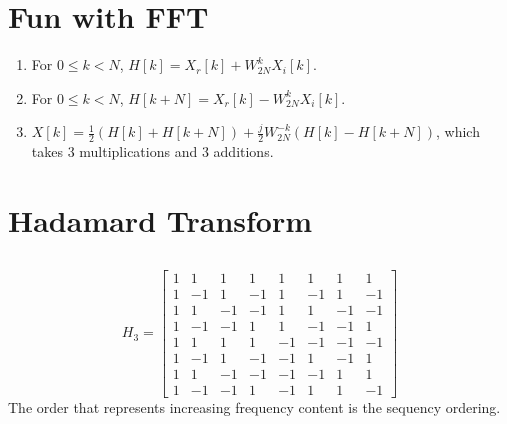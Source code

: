 \documentclass{article}
\begin{document}
\newpage
\section{Fun with FFT}

\begin{enumerate}
    \item For \(0 \leqslant k < N\), \(H[k] = X_r[k] + W_{2N}^k X_i[k]\).
    \item For \(0 \leqslant k < N\), \(H[k + N] = X_r[k] - W_{2N}^k X_i[k]\).
    \item \(X[k] = \frac{1}{2} (H[k] + H[k + N]) + \frac{j}{2} W_{2N}^{-k} (H[k] - H[k + N])\), which takes 3 multiplications and 3 additions.
\end{enumerate}

\newpage
\section{Hadamard Transform}

\subsection{}

\begin{equation}
    H_3 =
    \begin{bmatrix}
        1 & 1 & 1 & 1 & 1 & 1 & 1 & 1 \\
        1 & -1 & 1 & -1 & 1 & -1 & 1 & -1 \\
        1 & 1 & -1 & -1 & 1 & 1 & -1 & -1 \\
        1 & -1 & -1 & 1 & 1 & -1 & -1 & 1 \\
        1 & 1 & 1 & 1 & -1 & -1 & -1 & -1 \\
        1 & -1 & 1 & -1 & -1 & 1 & -1 & 1 \\
        1 & 1 & -1 & -1 & -1 & -1 & 1 & 1 \\
        1 & -1 & -1 & 1 & -1 & 1 & 1 & -1
    \end{bmatrix}
\end{equation}
The order that represents increasing frequency content is the sequency ordering.

\subsection{}

\newpage
\section{}
\end{document}
